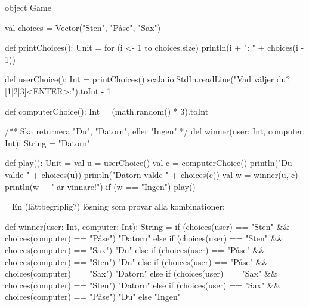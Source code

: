 \begin{Code}
object Game {
  val choices = Vector("Sten", "Påse", "Sax")

  def printChoices(): Unit =
    for (i <- 1 to choices.size) println(i + ": " + choices(i - 1))

  def userChoice(): Int = {
    printChoices()
    scala.io.StdIn.readLine("Vad väljer du? [1|2|3]<ENTER>:").toInt - 1
  }

  def computerChoice(): Int = (math.random() * 3).toInt

  /** Ska returnera "Du", "Datorn", eller "Ingen" */
  def winner(user: Int, computer: Int): String = "Datorn"

  def play(): Unit = {
    val u = userChoice()
    val c = computerChoice()
    println("Du valde " + choices(u))
    println("Datorn valde " + choices(c))
    val w = winner(u, c)
    println(w + " är vinnare!")
    if (w == "Ingen") play()
  }
}
\end{Code}

%
%
%
%
%
%
%



\SOLUTION

\TaskSolved \what~ En (lättbegriplig?) lösning som provar alla kombinationer:

\begin{CodeSmall}
  def winner(user: Int, computer: Int): String =
    if      (choices(user) == "Sten" && choices(computer) == "Påse") "Datorn"
    else if (choices(user) == "Sten" && choices(computer) == "Sax")  "Du"
    else if (choices(user) == "Påse" && choices(computer) == "Sten") "Du"
    else if (choices(user) == "Påse" && choices(computer) == "Sax")  "Datorn"
    else if (choices(user) == "Sax"  && choices(computer) == "Sten") "Datorn"
    else if (choices(user) == "Sax"  && choices(computer) == "Påse") "Du"
    else "Ingen"
\end{CodeSmall}


